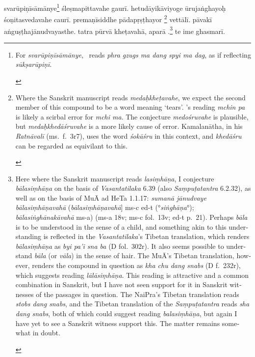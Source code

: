 \documentclass[naipra.tex]{subfiles}
\begin{document}
\begin{sanskrit}
\pstart
svarūpiṇīsāmānye\footnote{
	\begin{english}%
		For \emph{svarūpiṇīsāmānye}, \TIB\ reads \emph{phra gzugs ma dang spyi ma dag}, as if reflecting \emph{sūkṣarūpiṇī}.
	\end{english}
}  śleṣmapittavahe gaurī. 
hetudāyikāviyoge ūrujaṅghayoḥ śoṇitasvedavahe caurī. 
premaṇīsiddhe pādapṛṣṭhayor \footnote{
	\begin{english}%
		Where the Sanskrit manuscript reads \emph{medaḥkheṭavahe}, we expect the second member of this compound to be a word meaning `tears'.
		\TIB 's reading \emph{mchin pa} is likely a scirbal error for \emph{mchi ma}.
		The conjecture \emph{medośruvahe} is plausible, but \emph{medaḥkhedāśruvahe} is a more likely cause of error. 
		Kamalanātha, in his \emph{Ratnāvalī} (ms.\ f.\ 3r7), uses the word \emph{śokāśru} in this context, and \emph{khedāśru} can be regarded as equivilant to this.
	\end{english}
} vettālī. 
pāvakī aṅguṣṭhajānudvayasthe.
tatra pūrvā kheṭavahā, aparā .\footnote{
	\begin{english}%
		Here where the Sanskrit manuscript reads \emph{lasiṃhāṇa}, I conjecture \emph{bālasiṃhāṇa} on the basis of \emph{Vasantatilaka} 6.39 (also \emph{Saṃpuṭatantra} 6.2.32), as well as on the basis of MuĀ ad HeTa 1.1.17: \emph{sumanā jānudvaye bālasiṃhāṇavahā} (\emph{bālasiṃhāṇavahā}] ms-c ed-t (°\emph{siṅghāṇa}°); \emph{bālasiṅghānakāvahā} ms-a) (ms-a 18v; ms-c fol.\ 13v; ed-t p.\ 21).
		Perhaps \emph{bāla} is to be understood in the sense of a child, and something akin to this understanding is reflected in the \emph{Vasantatilaka}'s Tibetan translation, which renders \emph{bālasiṃhāṇa} as \emph{byi pa'i sna ba} (D fol.\ 302r).
		It also seems possible to understand \emph{bāla} (or \emph{vāla}) in the sense of hair.
		The MuĀ's Tibetan translation, however, renders the compound in question as \emph{kha chu dang snabs} (D f.\ 232r), which suggests reading \emph{lālāsiṃhāṇa}.
		This reading is attractive and a common combination in Sanskrit, but I have not seen support for it in Sanskrit witnesses of the passages in question.
		The NaiPra's Tibetan translation reads \emph{stobs dang snabs}, and the Tibetan translation of the \emph{Saṃpuṭatantra} reads \emph{sha dang snabs}, both of which could suggest reading \emph{balasiṃhāṇa}, but again I have yet to see a Sanskrit witness support this.
		The matter remains somewhat in doubt.
	\end{english}
}
te ime ghasmarī. 
\pend


\end{sanskrit}
\end{document}
